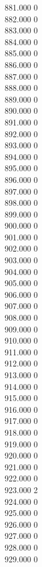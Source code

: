 { 881.000	0 \\
 882.000	0 \\
 883.000	0 \\
 884.000	0 \\
 885.000	0 \\
 886.000	0 \\
 887.000	0 \\
 888.000	0 \\
 889.000	0 \\
 890.000	0 \\
 891.000	0 \\
 892.000	0 \\
 893.000	0 \\
 894.000	0 \\
 895.000	0 \\
 896.000	0 \\
 897.000	0 \\
 898.000	0 \\
 899.000	0 \\
 900.000	0 \\
 901.000	0 \\
 902.000	0 \\
 903.000	0 \\
 904.000	0 \\
 905.000	0 \\
 906.000	0 \\
 907.000	0 \\
 908.000	0 \\
 909.000	0 \\
 910.000	0 \\
 911.000	0 \\
 912.000	0 \\
 913.000	0 \\
 914.000	0 \\
 915.000	0 \\
 916.000	0 \\
 917.000	0 \\
 918.000	0 \\
 919.000	0 \\
 920.000	0 \\
 921.000	0 \\
 922.000	0 \\
 923.000	2 \\
 924.000	0 \\
 925.000	0 \\
 926.000	0 \\
 927.000	0 \\
 928.000	0 \\
 929.000	0 \\
}
